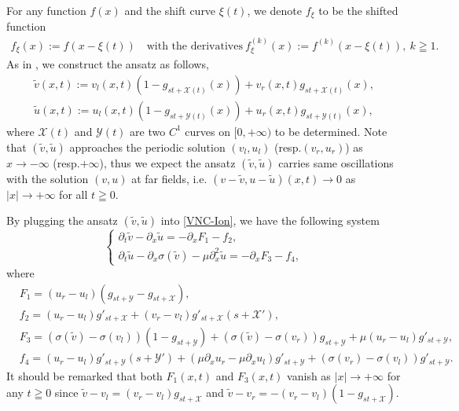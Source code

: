 \documentclass[12pt,reqno]{amsart}
\numberwithin{equation}{section}
\def\p{\partial}
\def\vt{\tilde{v}}
\def\ut{\tilde{u}}
\def\X{\mathcal{X}}
\def\Y{\mathcal{Y}}
\begin{document}
For any function $f(x)$ and the shift curve $\xi(t)$, we denote $f_\xi$ to be the shifted function
\begin{align*}
	f_\xi(x):=f(x-\xi(t)) \quad \text{with the derivatives}~f^{(k)}_\xi(x):=f^{(k)}(x-\xi(t)),~k\geqq 1.
\end{align*} 
As in \cite{HuangYuanCMP}, we construct the ansatz as follows,
	\begin{equation}\label{ansatz}
		\begin{aligned}
			\vt(x,t):=v_l(x,t)(1-g_{st+\X(t)}(x))+v_r(x,t)g_{st+\X(t)}(x),\\
			\ut(x,t):=u_l(x,t)(1-g_{st+\Y(t)}(x))+u_r(x,t)g_{st+\Y(t)}(x),
		\end{aligned}
	\end{equation}
where $\X(t)$ and $\Y(t)$ are two $C^1$ curves on $[0,+\infty)$ to be determined. Note that $(\vt,\ut)$ approaches the periodic solution 
$(v_l,u_l)$ (resp.$(v_r,u_r)$) as $x\to -\infty$ (resp.$+\infty$), thus we expect the ansatz $(\vt,\ut)$ carries same oscillations with the
solution $(v,u)$ at far fields, i.e. $(v-\vt,u-\ut)(x,t) \to 0$ as $|x| \to +\infty$ for all $t\geqq 0$.

By plugging the ansatz $(\vt,\ut)$ into \eqref{VNC-Ion}, we have the following system
\begin{equation}\label{VNC-T}
	\begin{cases}
		\p_t \vt-\p_x \ut=-\p_x F_1-f_2,\\
		\p_t\ut-\p_x\sigma(\vt)-\mu\p^2_x \ut=-\p_xF_3-f_4,
	\end{cases}
\end{equation}
where
\begin{equation}\label{F1234}
	\begin{aligned}
		&F_1=(u_r-u_l)(g_{st+\Y}-g_{st+\X}),\\
		&f_2=(u_r-u_l)g'_{st+\X}+(v_r-v_l)g'_{st+\X}(s+\X'),\\
		&F_3=(\sigma(\vt)-\sigma(v_l))(1-g_{st+\Y})+(\sigma(\vt)-\sigma(v_r))g_{st+\Y}+\mu(u_r-u_l)g'_{st+\Y},\\
		&f_4=(u_r-u_l)g'_{st+\Y}(s+\Y')+(\mu\p_xu_r-\mu\p_xu_l)g'_{st+\Y}+(\sigma(v_r)-\sigma(v_l))g'_{st+\Y}.
	\end{aligned}
\end{equation}
It should be remarked that both $F_1(x,t)$ and $F_3(x,t)$ vanish as $|x| \to +\infty$ for any $t\geqq 0$ since $\vt-v_l=(v_r-v_l)g_{st+\X}$ and $\vt-v_r=-(v_r-v_l)(1-g_{st+\X})$.
\end{document}
